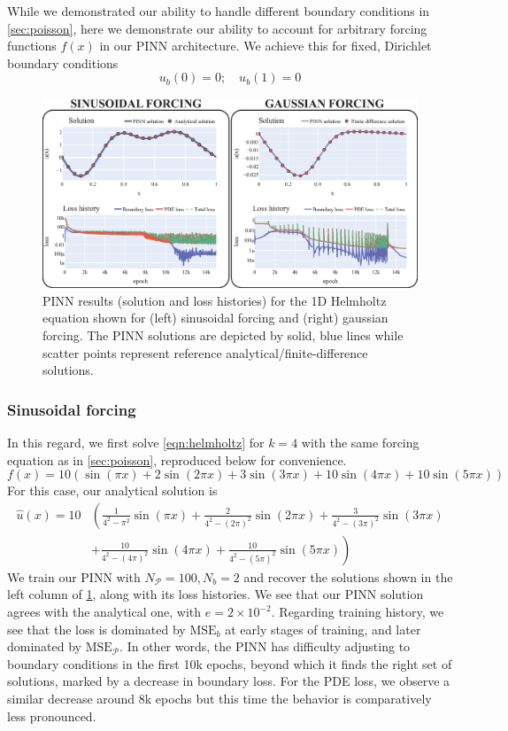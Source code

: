 \documentclass[11pt]{article}
\newcommand{\mse}{\textrm{MSE}}
\newcommand{\pde}{\ensuremath{\mathcal{P}}}
\begin{document}
While we demonstrated our ability to handle different boundary conditions in
\cref{sec:poisson}, here we demonstrate our ability to account for arbitrary forcing
functions \(f(x)\) in our PINN architecture. We achieve this for fixed, Dirichlet
boundary conditions
\[ u_b(0) = 0;\quad  u_b(1) = 0\]

\begin{figure}[htbp]
\centering
\includegraphics[width=1.0\textwidth]{images/helmholtz.eps}
\caption{\label{fig:helmholtz_results}PINN results (solution and loss histories) for the 1D Helmholtz equation shown for (left) sinusoidal forcing and (right) gaussian forcing. The PINN solutions are depicted by solid, blue lines while scatter points represent reference analytical/finite-difference solutions.}
\end{figure}
\subsubsection{Sinusoidal forcing}
\label{sec:org9d289cc}
In this regard, we first solve \cref{eqn:helmholtz} for \(k = 4\) with the
same forcing equation as in \cref{sec:poisson}, reproduced below for convenience.
\[ f(x) = 10 \left(\sin(\pi x) + 2\sin(2\pi x) + 3\sin(3\pi x) + 10\sin(4\pi
   x) + 10\sin(5\pi x)\right) \]
For this case, our analytical solution is
\begin{equation}
\begin{split}
  \hat{u}(x) = 10 &\left(\frac{1}{4^2 - \pi^2}\sin(\pi x) + \frac{2}{4^2 -
	 \left(2\pi\right)^2}\sin(2\pi x) + \frac{3}{4^2 -
   \left(3\pi\right)^2}\sin(3\pi x) \right. \\
 & \left. + \frac{10}{4^2 - \left(4\pi\right)^2} \sin(4\pi
   x) + \frac{10}{4^2 - \left(5\pi\right)^2}\sin(5\pi x) \right)
\end{split}
\end{equation}
We train our PINN with \(N_\pde = 100 , N_b = 2\) and recover the solutions
shown in the left column of \cref{fig:helmholtz_results}, along with its loss
histories. We see that our PINN solution agrees with the analytical one,
with \(e = 2 \times 10^{-2}\). Regarding training history, we see that the
loss is dominated by \(\mse_b\) at early stages of training, and later
dominated by \(\mse_\pde\). In other words, the PINN
has difficulty adjusting to boundary conditions in the first 10k epochs,
beyond which it finds the right set of solutions, marked by a decrease in
boundary loss. For the PDE loss, we observe a similar decrease around 8k
epochs but this time the behavior is comparatively less pronounced.
\end{document}
